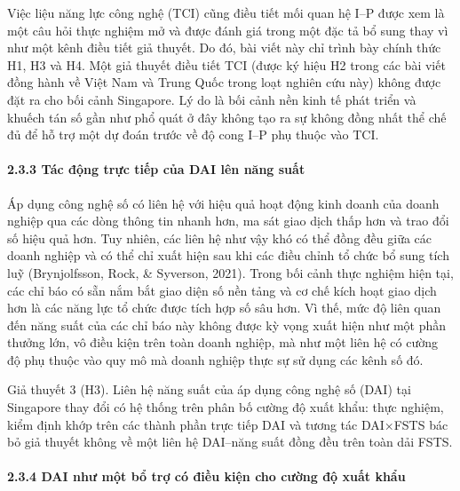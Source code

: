 \documentclass[12pt,a4paper]{article}
\begin{document}
Việc liệu năng lực công nghệ (TCI) cũng điều tiết mối quan hệ I--P được
xem là một câu hỏi thực nghiệm mở và được đánh giá trong một đặc tả bổ
sung thay vì như một kênh điều tiết giả thuyết. Do đó, bài viết này chỉ
trình bày chính thức H1, H3 và H4. Một giả thuyết điều tiết TCI (được ký
hiệu H2 trong các bài viết đồng hành về Việt Nam và Trung Quốc trong
loạt nghiên cứu này) không được đặt ra cho bối cảnh Singapore. Lý do là
bối cảnh nền kinh tế phát triển và khuếch tán số gần như phổ quát ở đây
không tạo ra sự không đồng nhất thể chế đủ để hỗ trợ một dự đoán trước
về độ cong I--P phụ thuộc vào TCI.

\hypertarget{233-tuxe1c-ux111ux1ed9ng-trux1ef1c-tiux1ebfp-cux1ee7a-dai-luxean-nux103ng-suux1ea5t}{%
\paragraph{2.3.3 Tác động trực tiếp của DAI lên năng
suất}\label{233-tuxe1c-ux111ux1ed9ng-trux1ef1c-tiux1ebfp-cux1ee7a-dai-luxean-nux103ng-suux1ea5t}}

Áp dụng công nghệ số có liên hệ với hiệu quả hoạt động kinh doanh của
doanh nghiệp qua các dòng thông tin nhanh hơn, ma sát giao dịch thấp hơn
và trao đổi số hiệu quả hơn. Tuy nhiên, các liên hệ như vậy khó có thể
đồng đều giữa các doanh nghiệp và có thể chỉ xuất hiện sau khi các điều
chỉnh tổ chức bổ sung tích luỹ (Brynjolfsson, Rock, \& Syverson, 2021).
Trong bối cảnh thực nghiệm hiện tại, các chỉ báo có sẵn nắm bắt giao
diện số nền tảng và cơ chế kích hoạt giao dịch hơn là các năng lực tổ
chức được tích hợp số sâu hơn. Vì thế, mức độ liên quan đến năng suất
của các chỉ báo này không được kỳ vọng xuất hiện như một phần thưởng
lớn, vô điều kiện trên toàn doanh nghiệp, mà như một liên hệ có cường độ
phụ thuộc vào quy mô mà doanh nghiệp thực sự sử dụng các kênh số đó.

Giả thuyết 3 (H3). Liên hệ năng suất của áp dụng công nghệ số (DAI) tại
Singapore thay đổi có hệ thống trên phân bố cường độ xuất khẩu: thực
nghiệm, kiểm định khớp trên các thành phần trực tiếp DAI và tương tác
DAI×FSTS bác bỏ giả thuyết không về một liên hệ DAI--năng suất đồng đều
trên toàn dải FSTS.

\hypertarget{234-dai-nhux1b0-mux1ed9t-bux1ed5-trux1ee3-cuxf3-ux111iux1ec1u-kiux1ec7n-cho-cux1b0ux1eddng-ux111ux1ed9-xuux1ea5t-khux1ea9u}{%
\paragraph{2.3.4 DAI như một bổ trợ có điều kiện cho cường độ xuất
khẩu}\label{234-dai-nhux1b0-mux1ed9t-bux1ed5-trux1ee3-cuxf3-ux111iux1ec1u-kiux1ec7n-cho-cux1b0ux1eddng-ux111ux1ed9-xuux1ea5t-khux1ea9u}}
\end{document}
